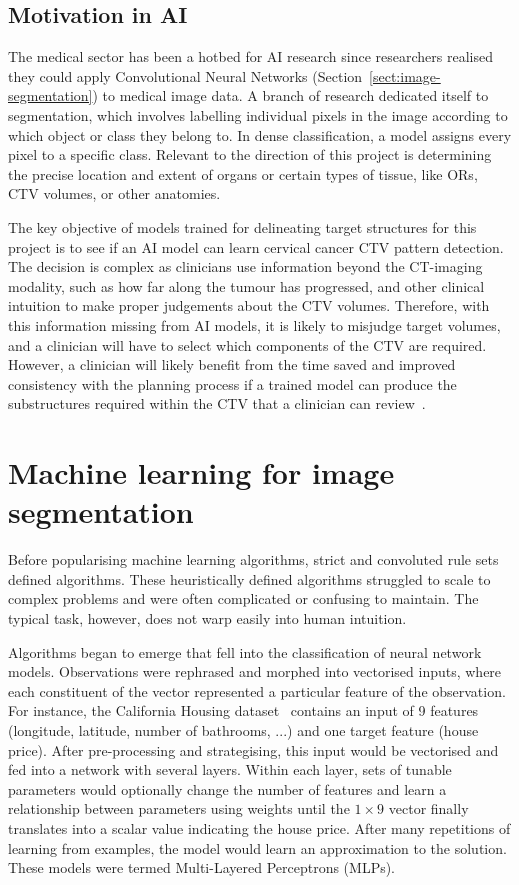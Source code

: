 \documentclass[12pt,twoside]{report}
\begin{document}
\subsection{Motivation in AI}

The medical sector has been a hotbed for AI research since researchers realised they could apply Convolutional Neural Networks (Section~\ref{sect:image-segmentation}) to medical image data. A branch of research dedicated itself to segmentation, which involves labelling individual pixels in the image according to which object or class they belong to. In dense classification, a model assigns every pixel to a specific class. Relevant to the direction of this project is determining the precise location and extent of organs or certain types of tissue, like ORs, CTV volumes, or other anatomies. 

The key objective of models trained for delineating target structures for this project is to see if an AI model can learn cervical cancer CTV pattern detection. The decision is complex as clinicians use information beyond the CT-imaging modality, such as how far along the tumour has progressed, and other clinical intuition to make proper judgements about the CTV volumes. Therefore, with this information missing from AI models, it is likely to misjudge target volumes, and a clinician will have to select which components of the CTV are required. However, a clinician will likely benefit from the time saved and improved consistency with the planning process if a trained model can produce the substructures required within the CTV that a clinician can review~\cite{AMLART-data}.

\section{Machine learning for image segmentation}\label{sect:machine-learning-for-image-segmentation}

Before popularising machine learning algorithms, strict and convoluted rule sets defined algorithms. These heuristically defined algorithms struggled to scale to complex problems and were often complicated or confusing to maintain. The typical task, however, does not warp easily into human intuition.

Algorithms began to emerge that fell into the classification of neural network models. Observations were rephrased and morphed into vectorised inputs, where each constituent of the vector represented a particular feature of the observation. For instance, the California Housing dataset~\cite{kelleypace1997} contains an input of 9 features (longitude, latitude, number of bathrooms, ...) and one target feature (house price). After pre-processing and strategising, this input would be vectorised and fed into a network with several layers. Within each layer, sets of tunable parameters would optionally change the number of features and learn a relationship between parameters using weights until the $1 \times 9$ vector finally translates into a scalar value indicating the house price. After many repetitions of learning from examples, the model would learn an approximation to the solution. These models were termed Multi-Layered Perceptrons (MLPs).
\end{document}
